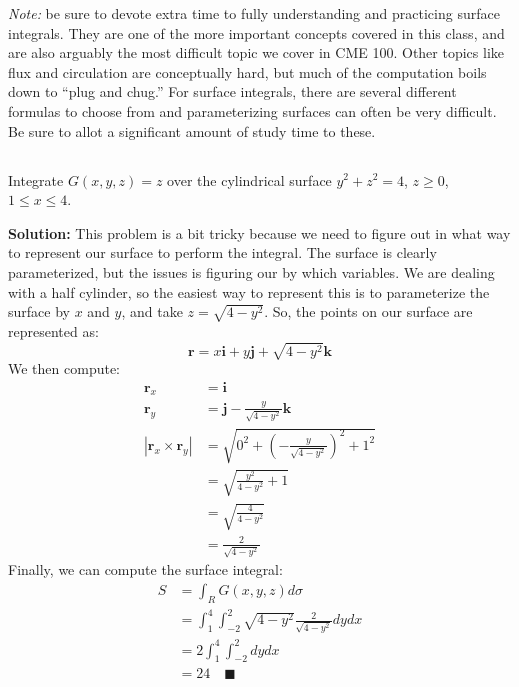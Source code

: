 \documentclass[letterpaper, 11pt]{article}
\begin{document}
\par \textit{Note:} be sure to devote extra time to fully understanding and practicing surface integrals. They are one of the more important concepts covered in this class, and are also arguably the most difficult topic we cover in CME 100. Other topics like flux and circulation are conceptually hard, but much of the computation boils down to ``plug and chug.'' For surface integrals, there are several different formulas to choose from and parameterizing surfaces can often be very difficult. Be sure to allot a significant amount of study time to these.

\subsection{} Integrate $G(x,y,z) = z$ over the  cylindrical surface $y^2 +z^2 = 4$, $z \geq 0$, $1 \leq x \leq 4$. 
\par \textbf{Solution:} This problem is a bit tricky because we need to figure out in what way to represent our surface to perform the integral. The surface is clearly parameterized, but the issues is figuring our by which variables. We are dealing with a half cylinder, so the easiest way to represent this is to parameterize the surface by $x$ and $y$, and take $z = \sqrt{4 - y^2}$. So, the points on our surface are represented as:
\[ \bm{r} = x \bm{i} + y \bm{j} + \sqrt{4 - y^2} \bm{k} \]
We then compute:
\begin{align*}
\bm{r}_x &= \bm{i}\\
\bm{r}_y &= \bm{j} - \frac{y}{\sqrt{4 - y^2}} \bm{k} \\
|\bm{r}_x \times \bm{r}_y| &= \sqrt{ 0^2 +\left( -\frac{y}{\sqrt{4 - y^2}}\right)^2 +  1^2} \\
&= \sqrt{ \frac{y^2}{4 - y^2} + 1}\\
&= \sqrt{ \frac{ 4}{4 - y^2}} \\
&= \frac{2}{\sqrt{4 - y^2}} 
\end{align*}
Finally, we can compute the surface integral:
\begin{align*}
S &= \int_R G(x,y,z) d\sigma \\
&= \int_1^4 \int_{-2}^2 \sqrt{ 4 - y^2} \frac{2}{\sqrt{4 - y^2}} dy dx \\
&= 2 \int_1^4 \int_{-2}^2 dy dx\\
&= 24 \quad\blacksquare
\end{align*}


\end{document}
